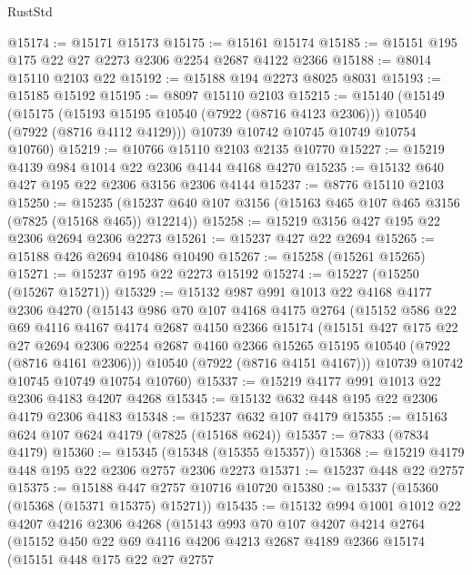 \begin{lexlean}{RustStd}
\begin{coremodule}
@15174 := @15171 @15173
@15175 := @15161 @15174
@15185 := @15151 @195 @175 @22 @27 @2273 @2306 @2254 @2687 @4122 @2366
@15188 := @8014 @15110 @2103 @22
@15192 := @15188 @194 @2273 @8025 @8031
@15193 := @15185 @15192
@15195 := @8097 @15110 @2103
@15215 := @15140
    (@15149
      (@15175 (@15193 @15195 @10540 (@7922 (@8716 @4123 @2306))) @10540 (@7922 (@8716 @4112 @4129)))
      @10739
      @10742
      @10745
      @10749
      @10754
      @10760)
@15219 := @10766 @15110 @2103 @2135 @10770
@15227 := @15219 @4139 @984 @1014 @22 @2306 @4144 @4168 @4270
@15235 := @15132 @640 @427 @195 @22 @2306 @3156 @2306 @4144
@15237 := @8776 @15110 @2103
@15250 := @15235 (@15237 @640 @107 @3156 (@15163 @465 @107 @465 @3156 (@7825 (@15168 @465)) @12214))
@15258 := @15219 @3156 @427 @195 @22 @2306 @2694 @2306 @2273
@15261 := @15237 @427 @22 @2694
@15265 := @15188 @426 @2694 @10486 @10490
@15267 := @15258 (@15261 @15265)
@15271 := @15237 @195 @22 @2273 @15192
@15274 := @15227 (@15250 (@15267 @15271))
@15329 := @15132
    @987
    @991
    @1013
    @22
    @4168
    @4177
    @2306
    @4270
    (@15143
      @986
      @70
      @107
      @4168
      @4175
      @2764
      (@15152
        @586
        @22
        @69
        @4116
        @4167
        @4174
        @2687
        @4150
        @2366
        @15174
        (@15151
          @427
          @175
          @22
          @27
          @2694
          @2306
          @2254
          @2687
          @4160
          @2366
          @15265
          @15195
          @10540
          (@7922 (@8716 @4161 @2306)))
        @10540
        (@7922 (@8716 @4151 @4167)))
      @10739
      @10742
      @10745
      @10749
      @10754
      @10760)
@15337 := @15219 @4177 @991 @1013 @22 @2306 @4183 @4207 @4268
@15345 := @15132 @632 @448 @195 @22 @2306 @4179 @2306 @4183
@15348 := @15237 @632 @107 @4179
@15355 := @15163 @624 @107 @624 @4179 (@7825 (@15168 @624))
@15357 := @7833 (@7834 @4179)
@15360 := @15345 (@15348 (@15355 @15357))
@15368 := @15219 @4179 @448 @195 @22 @2306 @2757 @2306 @2273
@15371 := @15237 @448 @22 @2757
@15375 := @15188 @447 @2757 @10716 @10720
@15380 := @15337 (@15360 (@15368 (@15371 @15375) @15271))
@15435 := @15132
    @994
    @1001
    @1012
    @22
    @4207
    @4216
    @2306
    @4268
    (@15143
      @993
      @70
      @107
      @4207
      @4214
      @2764
      (@15152
        @450
        @22
        @69
        @4116
        @4206
        @4213
        @2687
        @4189
        @2366
        @15174
        (@15151
          @448
          @175
          @22
          @27
          @2757

\end{coremodule}
\end{lexlean}

